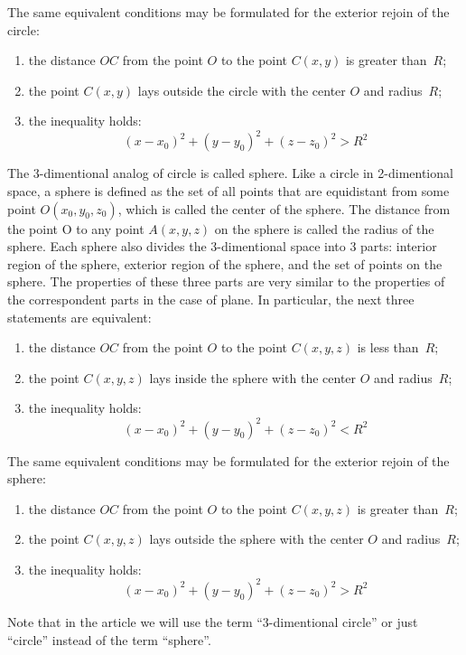 \documentclass{article}
\begin{document}
The same equivalent conditions may be formulated for the exterior rejoin of the circle:
\begin{enumerate}
\item
the distance $OC$ from the point $O$ to the point $C(x, y)$ is greater than~$R$;
\item
the point $C(x, y)$ lays outside the circle with the center $O$ and radius~$R$;
\item
the inequality holds:
\begin{equation}
  (x - x_0)^2 + (y - y_0)^2 + (z - z_0)^2 > R^2
\end{equation}
\end{enumerate}
The 3-dimentional analog of circle is called sphere. Like a circle in 2-dimentional space,
a sphere is defined as the set of all points that are equidistant from some point $O(x_0, y_0, z_0)$, which is called the center of the sphere.
The distance from the point O to any point $A(x, y, z)$ on the sphere is called the radius of the sphere.
Each sphere also divides the 3-dimentional space into 3 parts: interior region of the sphere, exterior region of the sphere, and the set of points on the sphere.
The properties of these three parts are very similar to the properties of the correspondent parts in the case of plane.
In particular, the next three statements are equivalent:
\begin{enumerate}
\item
the distance $OC$ from the point $O$ to the point $C(x, y, z)$ is less than~$R$;
\item
the point $C(x, y, z)$ lays inside the sphere with the center $O$ and radius~$R$;
\item
the inequality holds:
\begin{equation}
  (x - x_0)^2 + (y - y_0)^2 + (z - z_0)^2 < R^2
\end{equation}
\end{enumerate}
The same equivalent conditions may be formulated for the exterior rejoin of the sphere:
\begin{enumerate}
\item
the distance $OC$ from the point $O$ to the point $C(x, y, z)$ is greater than~$R$;
\item
the point $C(x, y, z)$ lays outside the sphere with the center $O$ and radius~$R$;
\item
the inequality holds:
\begin{equation}
  (x - x_0)^2 + (y - y_0)^2 + (z - z_0)^2 > R^2
\end{equation}
\end{enumerate}
Note that in the article we will use the term “3-dimentional circle” or just “circle” instead of the term “sphere”.
\end{document}
